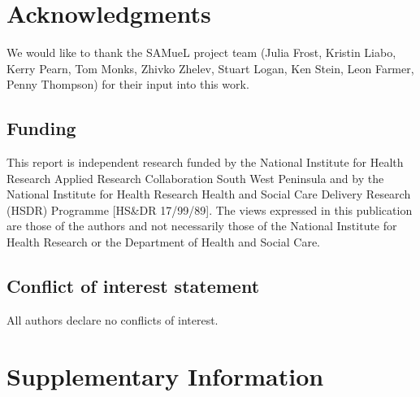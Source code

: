 \documentclass[12pt,a4paper, pdftex]{elsarticle}
\newcommand{\beginsupplement}{%
        \setcounter{table}{0}
        \renewcommand{\thetable}{S\arabic{table}}%
        \setcounter{figure}{0}
        \renewcommand{\thefigure}{S\arabic{figure}}%
     }
\begin{document}
\section*{Acknowledgments}

We would like to thank the SAMueL project team (Julia Frost, Kristin Liabo, Kerry Pearn, Tom Monks, Zhivko Zhelev, Stuart Logan, Ken Stein, Leon Farmer, Penny Thompson) for their input into this work.

\subsection*{Funding}

This report is independent research funded by the National Institute for Health Research Applied Research Collaboration South West Peninsula and by the National Institute for Health Research Health and Social Care Delivery Research (HSDR) Programme [HS\&DR 17/99/89]. The views expressed in this publication are those of the authors and not necessarily those of the National Institute for Health Research or the Department of Health and Social Care.

\subsection*{Conflict of interest statement}

All authors declare no conflicts of interest.






\clearpage


\beginsupplement
\section*{Supplementary Information}

\end{document}
